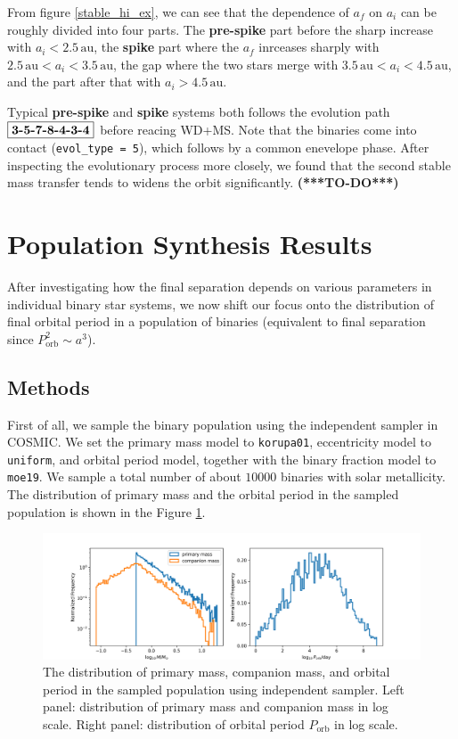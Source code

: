 \documentclass[12pt]{article}
\newcommand{\Porb}{P_{\mathrm{orb}}}
\newcommand{\au}{\, \mathrm{au}}
\begin{document}
From figure \ref{stable_hi_ex}, we can see that the dependence of $a_f$ on $a_i$ can be roughly divided into four parts. The \textbf{pre-spike} part before the sharp increase with $a_i < 2.5 \au$, the \textbf{spike} part where the $a_f$ inrceases sharply with $2.5 \au < a_i < 3.5 \au$, the gap where the two stars merge with $3.5 \au < a_i < 4.5 \au$, and the part after that with $a_i > 4.5 \au$.

Typical \textbf{pre-spike} and \textbf{spike} systems both follows the evolution path $\boxed{\text{\textbf{3-5-7-8-4-3-4}}}$ before reacing WD+MS. Note that the binaries come into contact (\verb|evol_type = 5|), which follows by a common enevelope phase. After inspecting the evolutionary process more closely, we found that the second stable mass transfer tends to widens the orbit significantly. \textbf{(***TO-DO***)}

\section{Population Synthesis Results} \label{sec:population}
After investigating how the final separation depends on various parameters in individual binary star systems, we now shift our focus onto the distribution of final orbital period in a population of binaries (equivalent to final separation since $\Porb^2 \sim a^3$).

\subsection{Methods}
First of all, we sample the binary population using the independent sampler in COSMIC. We set the primary mass model to \verb|korupa01|, eccentricity model to \verb|uniform|, and orbital period model, together with the binary fraction model to \verb|moe19|. We sample a total number of about $10000$ binaries with solar metallicity. The distribution of primary mass and the orbital period in the sampled population is shown in the Figure \ref{sample-distribution}.

\begin{figure}
  \centering
  \includegraphics[width=\linewidth]{fig/sample-distribution.png}
  \caption{The distribution of primary mass, companion mass, and orbital period in the sampled population using independent sampler. Left panel: distribution of primary mass and companion mass in log scale. Right panel: distribution of orbital period $\Porb$ in log scale.}
  \label{sample-distribution}
\end{figure}
\end{document}
